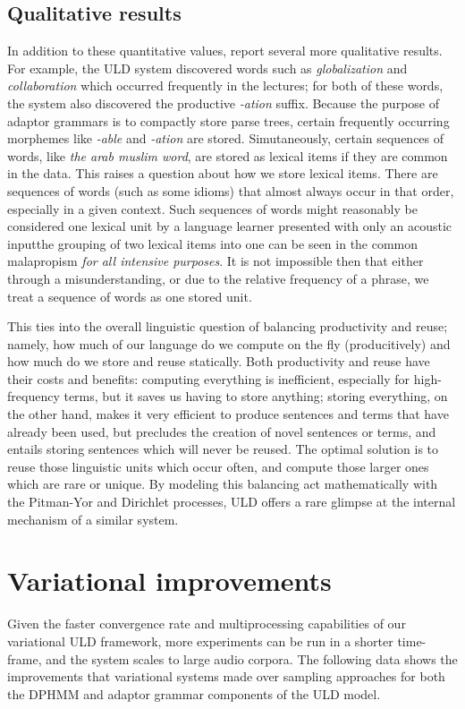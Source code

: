\documentclass[12pt,letterpaper]{article}
\begin{document}
\subsection{Qualitative results}
In addition to these quantitative values, \citet{lee:2015} report several more qualitative results. For example, the ULD system discovered words such as \textit{globalization} and \textit{collaboration} which occurred frequently in the lectures; for both of these words, the system also discovered the productive \textit{-ation} suffix. Because the purpose of adaptor grammars is to compactly store parse trees, certain frequently occurring morphemes like \textit{-able} and \textit{-ation} are stored. Simutaneously, certain sequences of words, like \textit{the arab muslim word}, are stored as lexical items if they are common in the data. This raises a question about how we store lexical items. There are sequences of words (such as some idioms) that almost always occur in that order, especially in a given context. Such sequences of words might reasonably be considered one lexical unit by a language learner presented with only an acoustic input\textemdash  the grouping of two lexical items into one can be seen in the common malapropism \textit{for all intensive purposes}. It is not impossible then that either through a misunderstanding, or due to the relative frequency of a phrase, we treat a sequence of words as one stored unit. 

This ties into the overall linguistic question of balancing productivity and reuse; namely, how much of our language do we compute on the fly (producitively) and how much do we store and reuse statically. Both productivity and reuse have their costs and benefits: computing everything is inefficient, especially for high-frequency terms, but it saves us having to store anything; storing everything, on the other hand, makes it very efficient to produce sentences and terms that have already been used, but precludes the creation of novel sentences or terms, and entails storing sentences which will never be reused. The optimal solution is to reuse those linguistic units which occur often, and compute those larger ones which are rare or unique. By modeling this balancing act mathematically with the Pitman-Yor and Dirichlet processes, ULD offers a rare glimpse at the internal mechanism of a similar system. 

\section{Variational improvements}
Given the faster convergence rate and multiprocessing capabilities of our variational ULD framework, more experiments can be run in a shorter time-frame, and the system scales to large audio corpora. The following data shows the improvements that variational systems made over sampling approaches for both the DPHMM and adaptor grammar components of the ULD model. 
\end{document}
